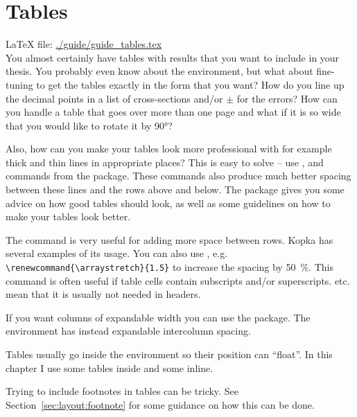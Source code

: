 \chapter{Tables}
\label{sec:table}

\LaTeX{} file: \url{./guide/guide_tables.tex}\\[1ex]
\noindent
You almost certainly have tables with results that you want to include
in your thesis. You probably even know about the 
environment, but what about fine-tuning to get the tables exactly in
the form that you want? How do you line up the decimal points in a
list of cross-sections and/or $\pm$ for the errors? How can you
handle a table that goes over more than one page and what if it is so
wide that you would like to rotate it by \ang{90}?

Also, how can you make your tables look more professional with for
example thick and thin lines in appropriate places? This is easy to
solve -- use ,  and 
commands from the  package. These commands also
produce much better spacing between these lines and the rows above and
below. The  package gives you some advice on how
good tables should look, as well as some guidelines on how to make your
tables look better.

The  command is very useful for adding more space between
rows. Kopka has several examples of its usage. You can also use
, e.g. \verb+\renewcommand{\arraystretch}{1.5}+ to
increase the spacing by \SI{50}{\percent}. This command is often useful if table
cells contain subscripts and/or superscripts. 
etc. mean that it is usually not needed in headers.

If you want columns of expandable width you can use the
 package. The environment  has instead
expandable intercolumn spacing.

Tables usually go inside the  environment so their position
can \enquote{float}. In this chapter I use some tables inside 
and some inline.

Trying to include footnotes in tables can be tricky. See
Section~\ref{sec:layout:footnote} for some guidance on how this can be done.


